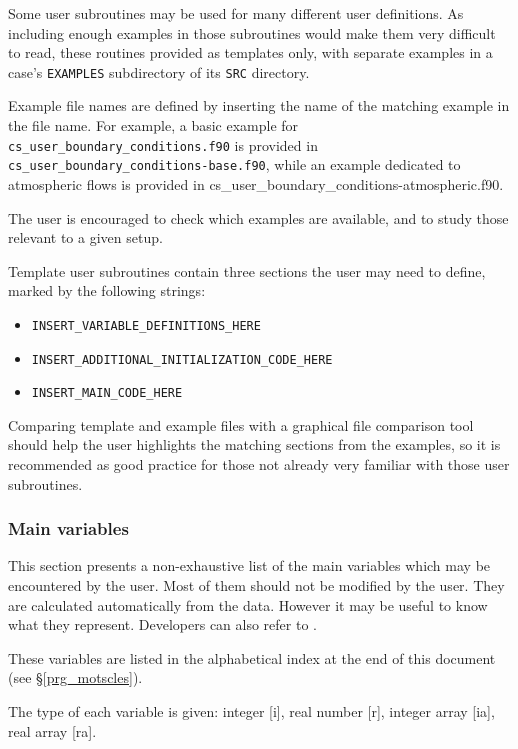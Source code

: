 {{{Some user subroutines may be used for many different user definitions. As
including enough examples in those subroutines would make them very
difficult to read, these routines provided as templates only, with
separate examples in a case's \texttt{EXAMPLES} subdirectory of its
\texttt{SRC} directory.

Example file names are defined by inserting the name of the matching example
in the file name. For example, a basic example for
\texttt{cs\_user\_boundary\_conditions.f90} is provided in \\
\texttt{cs\_user\_boundary\_conditions-base.f90}, while an example dedicated
to atmospheric flows is provided in
{cs\_user\_boundary\_conditions-atmospheric.f90}.

The user is encouraged to check which examples are available, and to study
those relevant to a given setup.

Template user subroutines contain three sections the user may need to define,
marked by the following strings:

\begin{itemize}
\item \texttt{INSERT\_VARIABLE\_DEFINITIONS\_HERE}
\item \texttt{INSERT\_ADDITIONAL\_INITIALIZATION\_CODE\_HERE}
\item \texttt{INSERT\_MAIN\_CODE\_HERE}
\end{itemize}

Comparing template and example files with a graphical file comparison tool
should help the user highlights the matching sections from the examples,
so it is recommended as good practice for those not already very familiar
with those user subroutines.

\subsubsection{Main variables}

This section presents a non-exhaustive list of the main variables which
may be encountered by the user. Most of them should not be modified by the
user. They are calculated automatically from the data. However it may be
useful to know what they represent.
Developers can also refer to \cite{theory}.

These variables are listed in the alphabetical index at the end of this
document (see \S\ref{prg_motscles}).

The type of each variable is given: integer [i], real number [r],
integer array [ia], real array [ra].

}}}
